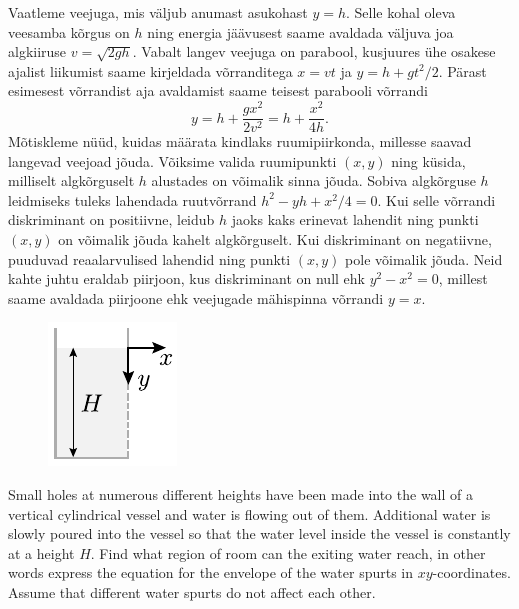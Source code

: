 {\ifSolution
Vaatleme veejuga, mis väljub anumast asukohast $y=h$. Selle kohal oleva veesamba kõrgus on $h$ ning energia jäävusest saame avaldada väljuva joa algkiiruse $v=\sqrt{2gh}$. Vabalt langev veejuga on parabool, kusjuures ühe osakese ajalist liikumist saame kirjeldada võrranditega $x=vt$ ja $y=h+gt^2/2$. Pärast esimesest võrrandist aja avaldamist saame teisest parabooli võrrandi
\[
y = h + \frac{gx^2}{2v^2} = h + \frac{x^2}{4h}.
\]
Mõtiskleme nüüd, kuidas määrata kindlaks ruumipiirkonda, millesse saavad langevad veejoad jõuda. Võiksime valida ruumipunkti $(x,y)$ ning küsida, milliselt algkõrguselt $h$ alustades on võimalik sinna jõuda. Sobiva algkõrguse $h$ leidmiseks tuleks lahendada ruutvõrrand $h^2 - yh + x^2/4 = 0$. Kui selle võrrandi diskriminant on positiivne, leidub $h$ jaoks kaks erinevat lahendit ning punkti $(x,y)$ on võimalik jõuda kahelt algkõrguselt. Kui diskriminant on negatiivne, puuduvad reaalarvulised lahendid ning punkti $(x,y)$ pole võimalik jõuda. Neid kahte juhtu eraldab piirjoon, kus diskriminant on null ehk $y^2 - x^2=0$, millest saame avaldada piirjoone ehk veejugade mähispinna võrrandi $y=x$.
\fi


\ifEngStatement
\begin{figure}%
\vspace{-15pt}
\includegraphics[width=\linewidth]{2015-lahg-07-veejoadJoon}%
\end{figure}
Small holes at numerous different heights have been made into the wall of a vertical cylindrical vessel and water is flowing out of them. Additional water is slowly poured into the vessel so that the water level inside the vessel is constantly at a height $H$. Find what region of room can the exiting water reach, in other words express the equation for the envelope of the water spurts in $xy$-coordinates. Assume that different water spurts do not affect each other.
\fi


}
